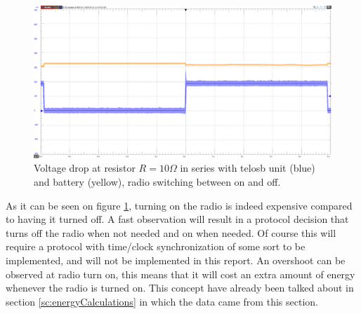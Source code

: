 \begin{figure}[H]
	\centering
	\includegraphics[width=\linewidth]{implementation/energylab/fig/radioSwitching.png}
	\caption{Voltage drop at resistor $R=10\Omega$ in series with telosb unit (blue) and battery (yellow), radio switching between on and off.}
	\label{fig:radioSwitching}
\end{figure}

\noindent As it can be seen on figure \ref{fig:radioSwitching}, turning on the radio is indeed expensive compared to having it turned off. A fast observation will result in a protocol decision that turns off the radio when not needed and on when needed. Of course this will require a protocol with time/clock synchronization of some sort to be implemented, and will not be implemented in this report. An overshoot can be observed at radio turn on, this means that it will cost an extra amount of energy whenever the radio is turned on. This concept have already been talked about in section \ref{sc:energyCalculations} in which the data came from this section.
